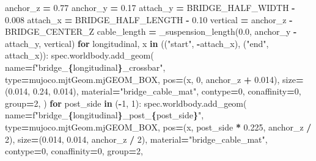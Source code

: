 \documentclass[
  chinese,
  11pt,
  letterpaper,
]{article}
\newenvironment{Shaded}{\begin{snugshade}}{\end{snugshade}}
\newcommand{\BuiltInTok}[1]{#1}
\newcommand{\ControlFlowTok}[1]{\textcolor[rgb]{0.13,0.29,0.53}{\textbf{#1}}}
\newcommand{\DecValTok}[1]{\textcolor[rgb]{0.00,0.00,0.81}{#1}}
\newcommand{\FloatTok}[1]{\textcolor[rgb]{0.00,0.00,0.81}{#1}}
\newcommand{\KeywordTok}[1]{\textcolor[rgb]{0.13,0.29,0.53}{\textbf{#1}}}
\newcommand{\NormalTok}[1]{#1}
\newcommand{\OperatorTok}[1]{\textcolor[rgb]{0.81,0.36,0.00}{\textbf{#1}}}
\newcommand{\SpecialCharTok}[1]{\textcolor[rgb]{0.81,0.36,0.00}{\textbf{#1}}}
\newcommand{\SpecialStringTok}[1]{\textcolor[rgb]{0.31,0.60,0.02}{#1}}
\newcommand{\StringTok}[1]{\textcolor[rgb]{0.31,0.60,0.02}{#1}}
\renewenvironment{Shaded}{\par\smallskip}{\par\smallskip}
\begin{document}
\begin{Shaded}
\begin{Highlighting}[]
\NormalTok{    anchor\_z }\OperatorTok{=} \FloatTok{0.77}
\NormalTok{    anchor\_y }\OperatorTok{=} \FloatTok{0.17}
\NormalTok{    attach\_y }\OperatorTok{=}\NormalTok{ BRIDGE\_HALF\_WIDTH }\OperatorTok{{-}} \FloatTok{0.008}
\NormalTok{    attach\_x }\OperatorTok{=}\NormalTok{ BRIDGE\_HALF\_LENGTH }\OperatorTok{{-}} \FloatTok{0.10}
\NormalTok{    vertical }\OperatorTok{=}\NormalTok{ anchor\_z }\OperatorTok{{-}}\NormalTok{ BRIDGE\_CENTER\_Z}
\NormalTok{    cable\_length }\OperatorTok{=}\NormalTok{ \_suspension\_length(}\FloatTok{0.0}\NormalTok{, anchor\_y }\OperatorTok{{-}}\NormalTok{ attach\_y, vertical)}
    \ControlFlowTok{for}\NormalTok{ longitudinal, x }\KeywordTok{in}\NormalTok{ ((}\StringTok{"start"}\NormalTok{, }\OperatorTok{{-}}\NormalTok{attach\_x), (}\StringTok{"end"}\NormalTok{, attach\_x)):}
\NormalTok{        spec.worldbody.add\_geom(}
\NormalTok{            name}\OperatorTok{=}\SpecialStringTok{f"bridge\_}\SpecialCharTok{\{}\NormalTok{longitudinal}\SpecialCharTok{\}}\SpecialStringTok{\_crossbar"}\NormalTok{, }\BuiltInTok{type}\OperatorTok{=}\NormalTok{mujoco.mjtGeom.mjGEOM\_BOX,}
\NormalTok{            pos}\OperatorTok{=}\NormalTok{(x, }\DecValTok{0}\NormalTok{, anchor\_z }\OperatorTok{+} \FloatTok{0.014}\NormalTok{), size}\OperatorTok{=}\NormalTok{(}\FloatTok{0.014}\NormalTok{, }\FloatTok{0.24}\NormalTok{, }\FloatTok{0.014}\NormalTok{),}
\NormalTok{            material}\OperatorTok{=}\StringTok{"bridge\_cable\_mat"}\NormalTok{, contype}\OperatorTok{=}\DecValTok{0}\NormalTok{, conaffinity}\OperatorTok{=}\DecValTok{0}\NormalTok{, group}\OperatorTok{=}\DecValTok{2}\NormalTok{,}
\NormalTok{        )}
        \ControlFlowTok{for}\NormalTok{ post\_side }\KeywordTok{in}\NormalTok{ (}\OperatorTok{{-}}\DecValTok{1}\NormalTok{, }\DecValTok{1}\NormalTok{):}
\NormalTok{            spec.worldbody.add\_geom(}
\NormalTok{                name}\OperatorTok{=}\SpecialStringTok{f"bridge\_}\SpecialCharTok{\{}\NormalTok{longitudinal}\SpecialCharTok{\}}\SpecialStringTok{\_post\_}\SpecialCharTok{\{}\NormalTok{post\_side}\SpecialCharTok{\}}\SpecialStringTok{"}\NormalTok{, }\BuiltInTok{type}\OperatorTok{=}\NormalTok{mujoco.mjtGeom.mjGEOM\_BOX,}
\NormalTok{                pos}\OperatorTok{=}\NormalTok{(x, post\_side }\OperatorTok{*} \FloatTok{0.225}\NormalTok{, anchor\_z }\OperatorTok{/} \DecValTok{2}\NormalTok{),}
\NormalTok{                size}\OperatorTok{=}\NormalTok{(}\FloatTok{0.014}\NormalTok{, }\FloatTok{0.014}\NormalTok{, anchor\_z }\OperatorTok{/} \DecValTok{2}\NormalTok{), material}\OperatorTok{=}\StringTok{"bridge\_cable\_mat"}\NormalTok{,}
\NormalTok{                contype}\OperatorTok{=}\DecValTok{0}\NormalTok{, conaffinity}\OperatorTok{=}\DecValTok{0}\NormalTok{, group}\OperatorTok{=}\DecValTok{2}\NormalTok{,}

\end{Highlighting}
\end{Shaded}
\end{document}
